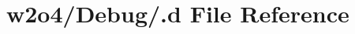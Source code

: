\hypertarget{w2o4_2_debug_2_8d}{}\section{w2o4/\+Debug/.d File Reference}
\label{w2o4_2_debug_2_8d}
